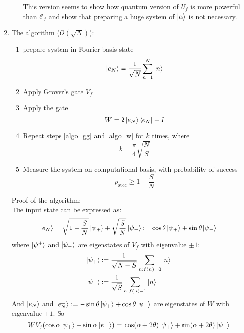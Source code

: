 \documentclass[11pt,a4paper]{article}%
\numberwithin{equation}{section}
\begin{document}
\begin{enumerate}
\begin{itemize}
        This version seems to show how quantum version of $U_f$ is more powerful than $\mathscr C_f$ and show that preparing a huge system of $\ket\alpha$ is not necessary.
    \end{itemize}
    \item The algorithm ($O(\sqrt N)$):
    \begin{enumerate}
        \item prepare system in Fourier basis state
        \begin{equation}
            \ket{e_N} = \frac 1{\sqrt N}\sum_{n=1}^N\ket n
        \end{equation}
        \item Apply Grover's gate $V_f$ \label{algo_gg}
        \item Apply the gate
        \begin{equation}
            W = 2\ket{e_N}\bra{e_N} - I
        \end{equation}\label{algo_w}
        \item Repeat steps \ref{algo_gg} and \ref{algo_w} for $k$ times, where
        \begin{equation}
            k = \frac\pi4\sqrt{\frac NS}
        \end{equation}
        \item Measure the system on computational basis, with probability of success
        \begin{equation}
            p_{\mathrm{succ}} \ge 1-\frac SN
        \end{equation}
    \end{enumerate}
    Proof of the algorithm:\\
    The input state can be expressed as:
    \begin{equation}
        \ket{e_N} = \sqrt{1-\frac SN}\ket{\psi_+} + \sqrt{\frac SN}\ket{\psi_-} := \cos\theta\ket{\psi_+} + \sin\theta\ket{\psi_-}
    \end{equation}
    where $\ket{\psi^+}$ and $\ket{\psi_-}$ are eigenstates of $V_f$ with eigenvalue $\pm 1$:
    \begin{align}
        \ket{\psi_+} &:= \frac 1{\sqrt{N-S}}\sum_{n:f(n)=0}\ket n \\
        \ket{\psi_-} &:= \frac 1{\sqrt S}\sum_{n:f(n)=1}\ket n 
    \end{align}
    And $\ket{e_N}$ and $\ket{e_N^\perp}:=-\sin\theta\ket{\psi_+} + \cos\theta\ket{\psi_-}$ are eigenstates of $W$ with eigenvalue $\pm 1$. So
    \begin{equation}
        WV_f(\cos\alpha\ket{\psi_+} + \sin\alpha\ket{\psi_-}) = \\\cos(\alpha+2\theta)\ket{\psi_+} + \sin(\alpha+2\theta)\ket{\psi_-}

\end{equation}
\end{enumerate}
\end{document}
